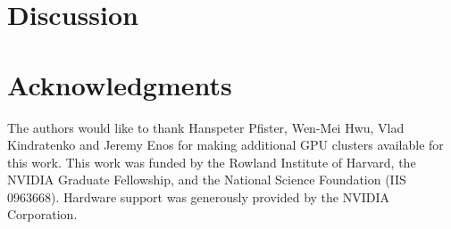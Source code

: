 \documentclass[preprint, 12pt]{elsarticle}
\begin{document}


\section{Discussion}



\section{Acknowledgments}
The authors would like to thank Hanspeter Pfister, Wen-Mei Hwu, Vlad
Kindratenko and Jeremy Enos for making additional GPU clusters available for
this work. This work was funded by the Rowland Institute of Harvard, the NVIDIA
Graduate Fellowship, and the National Science Foundation (IIS 0963668).
Hardware support was generously provided by the NVIDIA Corporation.




\end{document}
